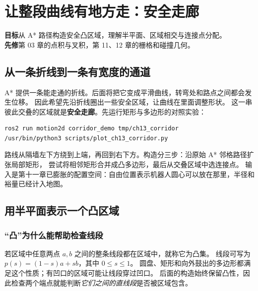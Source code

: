\chapter{让整段曲线有地方走：安全走廊}
\begin{notebox}
\textbf{目标}\quad 从 A* 路径构造安全凸区域，理解半平面、区域相交与连接点分配。\\
\textbf{先修}\quad 第 03 章的点积与叉积，第 11、12 章的栅格和碰撞几何。
\end{notebox}

\section{从一条折线到一条有宽度的通道}
A* 提供一条能走通的折线。后面将把它变成平滑曲线，转弯处和路点之间都会发生位移。
因此希望先沿折线圈出一些安全区域，让曲线在里面调整形状。
这一串彼此交叠的区域就是\textbf{安全走廊}。先运行矩形与多边形的对照实验：
\begin{lstlisting}[language=bash]
ros2 run motion2d corridor_demo tmp/ch13_corridor
/usr/bin/python3 scripts/plot_ch13_corridor.py
\end{lstlisting}
路线从隔墙左下方绕到上端，再回到右下方。构造分三步：沿原始 A* 邻格路径扩张局部矩形，
尝试将相邻矩形合并成凸多边形，最后从交叠区域中选连接点。
输入是第十一章已膨胀的配置空间：自由位置表示机器人圆心可以放在那里，半径和裕量已经计入地图。

\section{用半平面表示一个凸区域}
\subsection{“凸”为什么能帮助检查线段}
若区域中任意两点 $a,b$ 之间的整条线段都在区域中，就称它为凸集。
线段可写为 $p(s)=(1-s)a+sb$，其中 $0\leq s\leq1$。
圆盘、矩形和向外鼓出的多边形都满足这个性质；有凹口的区域可能让线段穿过凹口。
后面的构造始终保留凸性，因此检查两个端点就能判断\emph{它们之间的直线段}是否被区域包含。

